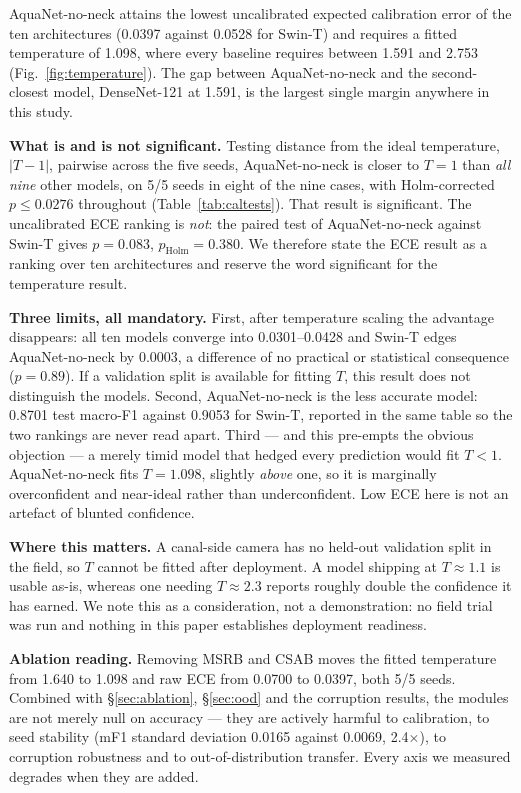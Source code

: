 \documentclass[10pt,journal]{IEEEtran}
\newcommand{\mf}{macro-F1}
\begin{document}
AquaNet-no-neck attains the lowest uncalibrated expected calibration error of the ten
architectures (0.0397 against 0.0528 for Swin-T) and requires a fitted temperature of 1.098,
where every baseline requires between 1.591 and 2.753 (Fig.~\ref{fig:temperature}). The gap
between AquaNet-no-neck and the second-closest model, DenseNet-121 at 1.591, is the largest
single margin anywhere in this study.



\textbf{What is and is not significant.} Testing distance from the ideal temperature,
$|T-1|$, pairwise across the five seeds, AquaNet-no-neck is closer to $T=1$ than
\emph{all nine} other models, on 5/5 seeds in eight of the nine cases, with Holm-corrected
$p\leq0.0276$ throughout (Table~\ref{tab:caltests}). That result is significant. The
uncalibrated ECE ranking is \emph{not}: the paired test of AquaNet-no-neck against Swin-T
gives $p=0.083$, $p_{\mathrm{Holm}}=0.380$. We therefore state the ECE result as a ranking
over ten architectures and reserve the word significant for the temperature result.

\textbf{Three limits, all mandatory.} First, after temperature scaling the advantage
disappears: all ten models converge into 0.0301--0.0428 and Swin-T edges AquaNet-no-neck by
0.0003, a difference of no practical or statistical consequence ($p=0.89$). If a validation
split is available for fitting $T$, this result does not distinguish the models. Second,
AquaNet-no-neck is the less accurate model: 0.8701 test \mf{} against 0.9053 for Swin-T,
reported in the same table so the two rankings are never read apart. Third --- and this
pre-empts the obvious objection --- a merely timid model that hedged every prediction would
fit $T<1$. AquaNet-no-neck fits $T=1.098$, slightly \emph{above} one, so it is marginally
overconfident and near-ideal rather than underconfident. Low ECE here is not an artefact of
blunted confidence.

\textbf{Where this matters.} A canal-side camera has no held-out validation split in the
field, so $T$ cannot be fitted after deployment. A model shipping at $T\approx1.1$ is usable
as-is, whereas one needing $T\approx2.3$ reports roughly double the confidence it has earned.
We note this as a consideration, not a demonstration: no field trial was run and nothing in
this paper establishes deployment readiness.

\textbf{Ablation reading.} Removing MSRB and CSAB moves the fitted temperature from 1.640 to
1.098 and raw ECE from 0.0700 to 0.0397, both 5/5 seeds. Combined with
\S\ref{sec:ablation}, \S\ref{sec:ood} and the corruption results, the modules are not merely
null on accuracy --- they are actively harmful to calibration, to seed stability (mF1
standard deviation 0.0165 against 0.0069, 2.4$\times$), to corruption robustness and to
out-of-distribution transfer. Every axis we measured degrades when they are added.
\end{document}
